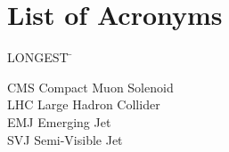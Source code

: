 

\chapter*{List of Acronyms}

\noindent
\vspace{-1.75\baselineskip}
\begin{tabbing}
	LONGEST \=  \kill %

	CMS \> Compact Muon Solenoid\\
	LHC \> Large Hadron Collider\\
	EMJ \> Emerging Jet\\
	SVJ \> Semi-Visible Jet\\

\end{tabbing}
